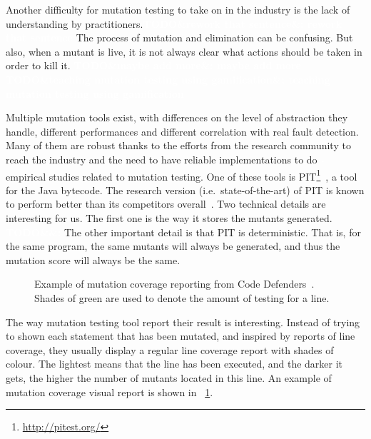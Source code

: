 \documentclass[11pt]{sdm_internship}
\newcommand{\todo}[1]{\colorbox{Red!75}{\textcolor{white}{\textbf{TODO\ifx&#1&\else: #1\fi}}}}
\newcommand{\rephrase}[1]{\colorbox{BlueViolet!60}{\textcolor{white}{\textbf{$\sim$#1}}}}
\theoremstyle{definition}
\begin{document}
Another difficulty for mutation testing to take on in the industry is the lack of understanding by practitioners.\todo{rework that sentence}
The process of mutation and elimination can be confusing.
But also, when a mutant is live, it is not always clear what actions should be taken in order to kill it.
\todo{maybe add more}
\todo{teaching mutation testing using gamification}

Multiple mutation tools exist, with differences on the level of abstraction they handle, different performances and different correlation with real fault detection.
Many of them are robust thanks to the efforts from the research community to reach the industry and the need to have reliable implementations to do\rephrase{} empirical studies related to mutation testing.
One of these tools is PIT\footnote{\url{http://pitest.org/}}~\cite{coles2016pit}, a tool for the Java bytecode.
The research version (i.e.\ state-of-the-art) of PIT is known to perform better than its competitors overall~\cite{kintis2017effective}.
Two technical details are interesting for us.
The first one is the way it stores the mutants generated.
\todo{}
The other important detail is that PIT is deterministic.
That is, for the same program, the same mutants will always be generated, and thus the mutation score will always be the same.

\begin{figure}
  \centering
  \caption{Example of mutation coverage reporting from Code Defenders\protect\footnotemark{}~\cite{rojas2017code}. Shades of green are used to denote the amount of testing for a line.}%
  \label{fig:screenshot_mutation_coverage}
\end{figure}
The way mutation testing tool report their result is interesting.
Instead of trying to shown each statement that has been mutated, and inspired by reports of line coverage, they usually display a regular line coverage report with shades of colour.
The lightest means that the line has been executed, and the darker it gets, the higher the number of mutants located in this line.
An example of mutation coverage visual report is shown in \figurename~\ref{fig:screenshot_mutation_coverage}.
\end{document}
